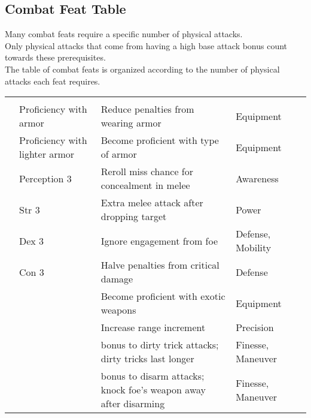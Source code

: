 \subsection{Combat Feat Table}\label{cap:Combat Feats}

Many combat feats require a specific number of physical attacks.\\
Only physical attacks that come from having a high base attack bonus count towards these prerequisites.\\
The table of combat feats is organized according to the number of physical attacks each feat requires.\\

{\small
    \begin{longtabu}{>{\lcol}p{10em} >{\lcol}p{15em} >{\lcol}X >{\lcol}p{6em} >{\lcol}p{3em}}
         &  &  &  &  \\
         & Proficiency with armor & Reduce penalties from wearing armor & Equipment &  \\
         & Proficiency with lighter armor & Become proficient with type of armor & Equipment &  \\
         & Perception 3 & Reroll miss chance for concealment in melee & Awareness &  \\
         & Str 3 & Extra melee attack after dropping target & Power &  \\
         & Dex 3 & Ignore engagement from foe & Defense, Mobility &  \\
         & Con 3 & Halve penalties from critical damage & Defense &  \\
         & \x & Become proficient with exotic weapons & Equipment &  \\
         & \x & Increase range increment & Precision &  \\
         & \x &  bonus to dirty trick attacks; dirty tricks last longer & Finesse, Maneuver &  \\
         & \x &  bonus to disarm attacks; knock foe's weapon away after disarming & Finesse, Maneuver &  \\

\end{longtabu}}
